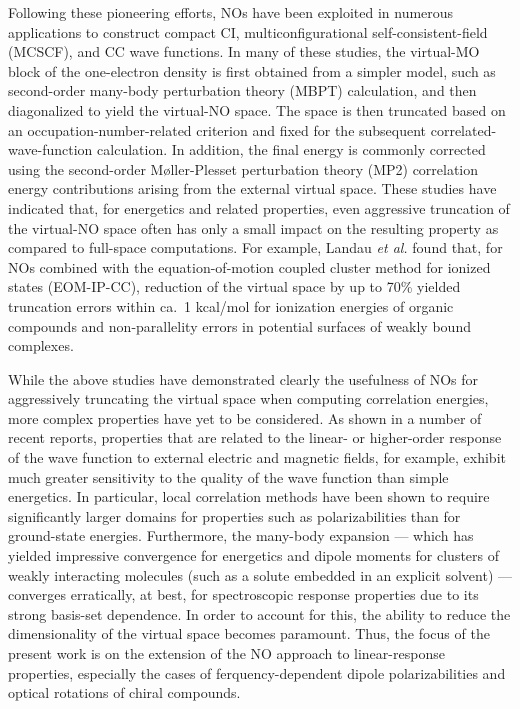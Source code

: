 \documentclass[11pt,article]{achemso}
\begin{document}
Following these pioneering efforts, NOs have been exploited in numerous
applications to construct compact CI,\cite{Fermann94,Sherrill98:CI,Abrams04}
multiconfigurational self-consistent-field (MCSCF),\cite{Jensen88} and CC wave
functions.\cite{Sosa89,Taube05,Taube08,Landau10,DePrince13:FNOs,DePrince13} In
many of these studies, the virtual-MO block of the one-electron density is
first obtained from a simpler model, such as second-order many-body
perturbation theory (MBPT) calculation, and then diagonalized to yield the
virtual-NO space.  The space is then truncated based on an
occupation-number-related criterion and fixed for the subsequent
correlated-wave-function calculation.  In addition, the final energy is
commonly corrected using the second-order M\o ller-Plesset perturbation theory
(MP2) correlation energy contributions arising from the external virtual
space.  These studies have indicated that, for energetics and related
properties, even aggressive truncation of the virtual-NO space often has only
a small impact on the resulting property as compared to full-space
computations.  For example, Landau {\em et al.}\cite{Landau10} found that,
for NOs
combined with the equation-of-motion coupled cluster method for ionized states
(EOM-IP-CC), reduction of the virtual space by up to 70\% yielded truncation
errors within ca.\ 1 kcal/mol for ionization energies of organic compounds and
non-parallelity errors in potential surfaces of weakly bound complexes.

While the above studies have demonstrated clearly the usefulness of NOs for
aggressively truncating the virtual space when computing correlation energies,
more complex properties have yet to be considered.  As shown in a number of
recent
reports,\cite{Korona04,Russ04,Russ08,McAlexander12,Friedrich15,McAlexander15:LRCC}
properties that are related to the linear- or higher-order response of the
wave function to external electric and magnetic fields, for example, exhibit
much greater sensitivity to the quality of the wave function than simple
energetics.  In particular, local correlation methods have been
shown\cite{Korona04,Russ04,Russ08,McAlexander12,McAlexander15:LRCC} to
require significantly larger domains for properties such as polarizabilities
than for ground-state energies.  Furthermore, the many-body expansion ---
which has yielded impressive convergence for energetics and dipole moments for
clusters of weakly interacting molecules (such as a solute embedded in an
explicit solvent) --- converges erratically, at best, for spectroscopic
response properties due to its strong basis-set dependence.\cite{Mach14}
In order to account for this, the ability to reduce the dimensionality
of the virtual space becomes paramount.  Thus, the focus of the present
work is on the extension of the NO approach to linear-response
properties, especially the cases of ferquency-dependent dipole
polarizabilities and optical rotations of chiral compounds.
\end{document}
